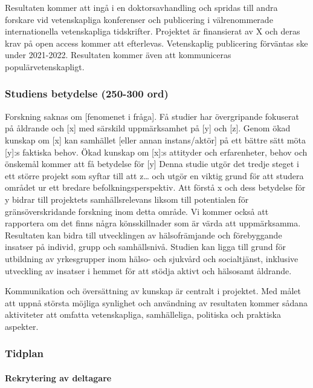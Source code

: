 \documentclass[]{tufte-handout}
\begin{document}
Resultaten kommer att ingå i en doktorsavhandling och spridas till andra
forskare vid vetenskapliga konferenser och publicering i välrenommerade
internationella vetenskapliga tidskrifter. Projektet är finansierat av X
och deras krav på open access kommer att efterlevas. Vetenskaplig
publicering förväntas ske under 2021-2022. Resultaten kommer även att
kommuniceras populärvetenskapligt.

\hypertarget{studiens-betydelse-250-300-ord}{%
\subsubsection{Studiens betydelse (250-300
ord)}\label{studiens-betydelse-250-300-ord}}

Forskning saknas om {[}fenomenet i fråga{]}. Få studier har övergripande
fokuserat på åldrande och {[}x{]} med särskild uppmärksamhet på {[}y{]}
och {[}z{]}. Genom ökad kunskap om {[}x{]} kan samhället {[}eller annan
instans/aktör{]} på ett bättre sätt möta {[}y{]}:s faktiska behov. Ökad
kunskap om {[}x{]}:s attityder och erfarenheter, behov och önskemål
kommer att få betydelse för {[}y{]} Denna studie utgör det tredje steget
i ett större projekt som syftar till att z\ldots{} och utgör en viktig
grund för att studera området ur ett bredare befolkningsperspektiv. Att
förstå x och dess betydelse för y bidrar till projektets
samhällsrelevans liksom till potentialen för gränsöverskridande
forskning inom detta område. Vi kommer också att rapportera om det finns
några könsskillnader som är värda att uppmärksamma. Resultaten kan bidra
till utvecklingen av hälsofrämjande och förebyggande insatser på
individ, grupp och samhällsnivå. Studien kan ligga till grund för
utbildning av yrkesgrupper inom hälso- och sjukvård och socialtjänst,
inklusive utveckling av insatser i hemmet för att stödja aktivt och
hälsosamt åldrande.

Kommunikation och översättning av kunskap är centralt i projektet. Med
målet att uppnå största möjliga synlighet och användning av resultaten
kommer sådana aktiviteter att omfatta vetenskapliga, samhälleliga,
politiska och praktiska aspekter.

\hypertarget{tidplan}{%
\subsubsection{Tidplan}\label{tidplan}}

\hypertarget{rekrytering-av-deltagare}{%
\paragraph{Rekrytering av deltagare}\label{rekrytering-av-deltagare}}
\end{document}
